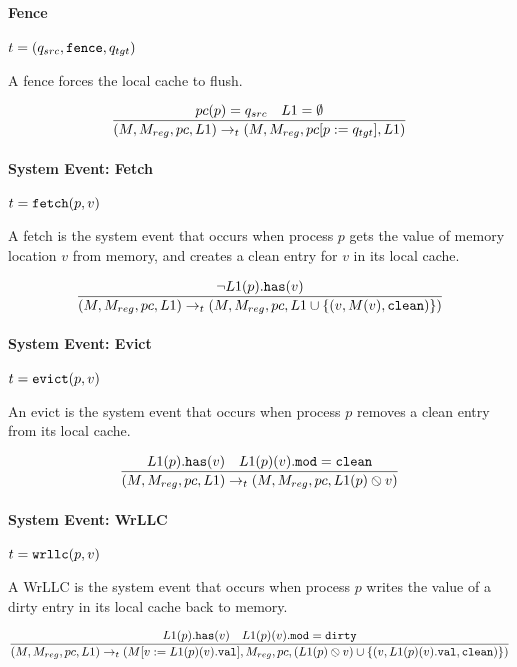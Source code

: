 \documentclass[a4paper]{article}
\begin{document}
\paragraph{Fence} $t = (q_{src},\fence,q_{tgt})$

A fence forces the local cache to flush.

\begin{displaymath}
  \frac{
    \pc(p) = q_{src} \sep
    \lone = \emptyset
  }{(\mem,\regval,\pc,\lone)\rightarrow_t(\mem,\regval,\pc[p:=q_{tgt}],\lone)}
\end{displaymath}

\paragraph{System Event: Fetch} $t = \fetch(p,v)$

A fetch is the system event that occurs when process $p$ gets the
value of memory location $v$ from memory, and creates a clean entry
for $v$ in its local cache.

\begin{displaymath}
  \frac{
    \notinlone{v}{\lone(p)}
  }{(\mem,\regval,\pc,\lone)\rightarrow_t(\mem,\regval,\pc,\lone\cup\{(v,\mem(v),\clean)\})}
\end{displaymath}

\paragraph{System Event: Evict} $t = \evict(p,v)$

An evict is the system event that occurs when process $p$ removes a
clean entry from its local cache.

\begin{displaymath}
  \frac{
    \inlone{v}{\lone(p)} \sep
    \lonemodof{\lone(p)}{v} = \clean
  }{(\mem,\regval,\pc,\lone)\rightarrow_t(\mem,\regval,\pc,\lonerem{\lone(p)}{v})}
\end{displaymath}

\paragraph{System Event: WrLLC} $t = \wrllc(p,v)$

A WrLLC is the system event that occurs when process $p$ writes the
value of a dirty entry in its local cache back to memory.

\begin{displaymath}
  \frac{
    \inlone{v}{\lone(p)} \sep
    \lonemodof{\lone(p)}{v} = \dirty
  }{(\mem,\regval,\pc,\lone)\rightarrow_t(\mem[v:=\lonevalof{\lone(p)}{v}],\regval,\pc,(\lonerem{\lone(p)}{v})\cup\{(v,\lonevalof{\lone(p)}{v},\clean)\})}
\end{displaymath}
\end{document}
